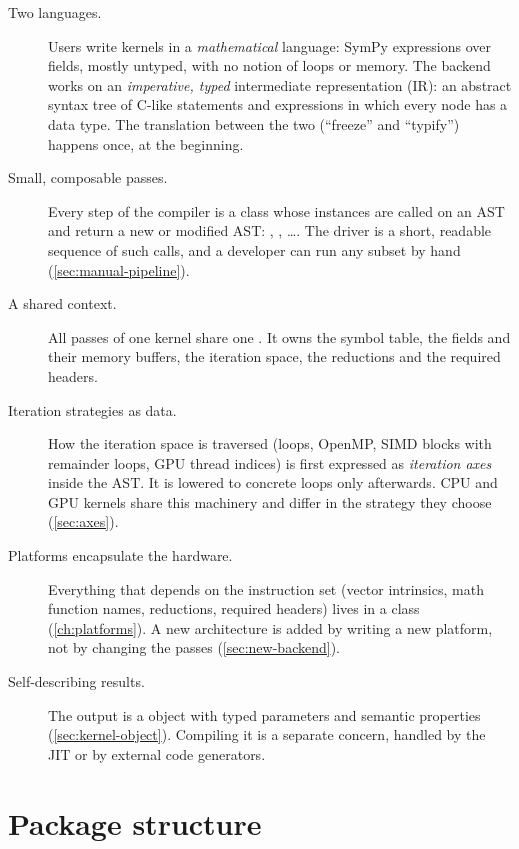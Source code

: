\begin{description}
  \item[Two languages.] Users write kernels in a \emph{mathematical} language: SymPy
        expressions over fields, mostly untyped, with no notion of loops or memory. The
        backend works on an \emph{imperative, typed} intermediate representation (IR): an
        abstract syntax tree of C-like statements and expressions in which every node has
        a data type. The translation between the two (``freeze'' and ``typify'')
        happens once, at the beginning.
  \item[Small, composable passes.] Every step of the compiler is a class whose
        instances are called on an AST and return a new or modified AST:
        , , \dots. The
        driver is a short, readable sequence of such calls, and a developer can run any
        subset by hand (\cref{sec:manual-pipeline}).
  \item[A shared context.] All passes of one kernel share one
        . It owns the symbol table, the fields and their
        memory buffers, the iteration space, the reductions and the required headers.
  \item[Iteration strategies as data.] How the iteration space is traversed (loops,
        OpenMP, SIMD blocks with remainder loops, GPU thread indices) is first expressed
        as \emph{iteration axes} inside the AST. It is lowered to concrete loops only
        afterwards. CPU and GPU kernels share this machinery and differ in the
        strategy they choose (\cref{sec:axes}).
  \item[Platforms encapsulate the hardware.] Everything that depends on the instruction
        set (vector intrinsics, math function names, reductions, required headers) lives
        in a  class (\cref{ch:platforms}). A new architecture is added by
        writing a new platform, not by changing the passes (\cref{sec:new-backend}).
  \item[Self-describing results.] The output is a  object with typed
        parameters and semantic properties (\cref{sec:kernel-object}). Compiling it is
        a separate concern, handled by the JIT or by external code generators.
\end{description}

\section{Package structure}


